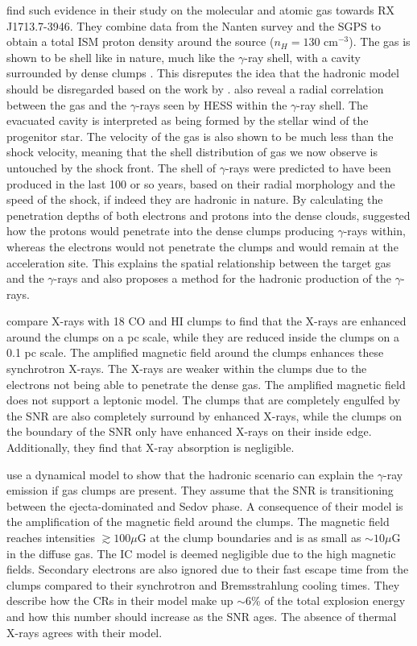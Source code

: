 \documentclass[12pt,a4paper]{article}
\begin{document}
\cite{2012ApJ...746...82F} find such evidence in their study on the molecular and atomic gas towards RX J1713.7-3946. They combine data from the Nanten survey and the SGPS to obtain a total ISM proton density around the source ($n_H = 130$ cm$^{-3}$). The gas is shown to be shell like in nature, much like the $\gamma$-ray shell, with a cavity surrounded by dense clumps . This disreputes the idea that the hadronic model should be disregarded based on the work by \cite{2018arXiv180410579C}. \cite{2012ApJ...746...82F} also reveal a radial correlation between the gas and the $\gamma$-rays seen by HESS within the $\gamma$-ray shell. The evacuated cavity is interpreted as being formed by the stellar wind of the progenitor star. The velocity of the gas is also shown to be much less than the shock velocity, meaning that the shell distribution of gas we now observe is untouched by the shock front. The shell of $\gamma$-rays were predicted to have been produced in the last 100 or so years, based on their radial morphology and the speed of the shock, if indeed they are hadronic in nature. By calculating the penetration depths of both electrons and protons into the dense clouds, \cite{2012ApJ...746...82F} suggested how the protons would penetrate into the dense clumps producing $\gamma$-rays within, whereas the electrons would not penetrate the clumps and would remain at the acceleration site. This explains the spatial relationship between the target gas and the $\gamma$-rays and also proposes a method for the hadronic production of the $\gamma$-rays.

\cite{2013ApJ...778...59S} compare X-rays with 18 CO and HI clumps to find that the X-rays are enhanced around the clumps on a pc scale, while they are reduced inside the clumps on a 0.1 pc scale. The amplified magnetic field around the clumps enhances these synchrotron X-rays. The X-rays are weaker within the clumps due to the electrons not being able to penetrate the dense gas. The amplified magnetic field does not support a leptonic model. The clumps that are completely engulfed by the SNR are also completely surround by enhanced X-rays, while the clumps on the boundary of the SNR only have enhanced X-rays on their inside edge. Additionally, they find that X-ray absorption is negligible. 

\cite{2013PASA...30...55M}

\cite{2014MNRAS.445L..70G} use a dynamical model to show that the hadronic scenario can explain the $\gamma$-ray emission if gas clumps are present. They assume that the SNR is transitioning between the ejecta-dominated and Sedov phase. A consequence of their model is the amplification of the magnetic field around the clumps. The magnetic field reaches intensities $\gtrsim 100 \mu$G at the clump boundaries and is as small as $\sim 10 \mu$G in the diffuse gas. The IC model is deemed negligible due to the high magnetic fields. Secondary electrons are also ignored due to their fast escape time from the clumps compared to their synchrotron and Bremsstrahlung cooling times. They describe how the CRs in their model make up $\sim$6\% of the total explosion energy and how this number should increase as the SNR ages. The absence of thermal X-rays agrees with their model. 
\end{document}
